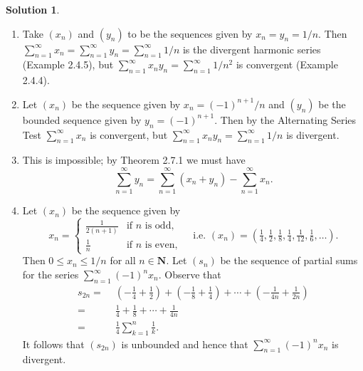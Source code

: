 \documentclass[12pt]{article}
\theoremstyle{definition}
\theoremstyle{exercise}
\theoremstyle{solution}
\newtheorem*{solution}{Solution}
\newcommand{\N}{\mathbf{N}}
\begin{document}
\begin{solution}
    \begin{enumerate}
        \item Take \( (x_n) \) and \( (y_n) \) to be the sequences given by \( x_n = y_n = 1/n \). Then \( \sum_{n=1}^{\infty} x_n = \sum_{n=1}^{\infty} y_n = \sum_{n=1}^{\infty} 1/n \) is the divergent harmonic series (Example 2.4.5), but \( \sum_{n=1}^{\infty} x_n y_n = \sum_{n=1}^{\infty} 1/n^2 \) is convergent (Example 2.4.4).

        \item Let \( (x_n) \) be the sequence given by \( x_n = (-1)^{n+1} / n \) and \( (y_n) \) be the bounded sequence given by \( y_n = (-1)^{n+1} \). Then by the Alternating Series Test \( \sum_{n=1}^{\infty} x_n \) is convergent, but \( \sum_{n=1}^{\infty} x_n y_n = \sum_{n=1}^{\infty} 1/n \) is divergent.

        \item This is impossible; by Theorem 2.7.1 we must have
        \[
            \sum_{n=1}^{\infty} y_n = \sum_{n=1}^{\infty} (x_n + y_n) - \sum_{n=1}^{\infty} x_n.
        \]

        \item Let \( (x_n) \) be the sequence given by
        \[
            x_n = \begin{cases}
                \frac{1}{2(n+1)} & \text{if } n \text{ is odd}, \\
                \frac{1}{n} & \text{if } n \text{ is even},
            \end{cases}
            \quad \text{i.e. } (x_n) = \left( \tfrac{1}{4}, \tfrac{1}{2}, \tfrac{1}{8}, \tfrac{1}{4}, \tfrac{1}{12}, \tfrac{1}{6}, \ldots \right).
        \]
        Then \( 0 \leq x_n \leq 1/n \) for all \( n \in \N \). Let \( (s_n) \) be the sequence of partial sums for the series \( \sum_{n=1}^{\infty} (-1)^n x_n \). Observe that
        \begin{align*}
            s_{2n} = \,\, & \left( -\frac{1}{4} + \frac{1}{2} \right) + \left( -\frac{1}{8} + \frac{1}{4} \right) + \cdots + \left( -\frac{1}{4n} + \frac{1}{2n} \right) \\[2mm]
            = \,\, & \frac{1}{4} + \frac{1}{8} + \cdots + \frac{1}{4n} \\[2mm]
            = \,\, & \frac{1}{4} \sum_{k=1}^n \frac{1}{k}.
        \end{align*}
        It follows that \( (s_{2n}) \) is unbounded and hence that \( \sum_{n=1}^{\infty} (-1)^n x_n \) is divergent.
    \end{enumerate}
\end{solution}
\end{document}
